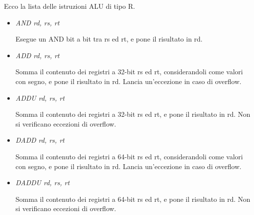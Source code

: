 \documentclass[letterpaper,10pt,english]{sphinxmanual}
\begin{document}
Ecco la lista delle istruzioni ALU di tipo R.
\begin{itemize}
\item {} 
\emph{AND rd, rs, rt}

Esegue un AND bit a bit tra rs ed rt, e pone il risultato in rd.

\item {} 
\emph{ADD rd, rs, rt}

Somma il contenuto dei registri a 32-bit rs ed rt, considerandoli come
valori con segno, e pone il risultato in rd.  Lancia un'eccezione in caso di
overflow.

\item {} 
\emph{ADDU rd, rs, rt}

Somma il contenuto dei registri a 32-bit rs ed rt, e pone il risultato in
rd. Non si verificano eccezioni di overflow.

\end{itemize}
\begin{itemize}
\item {} 
\emph{DADD rd, rs, rt}

Somma il contenuto dei registri a 64-bit rs ed rt, considerandoli come
valori con segno, e pone il risultato in rd.  Lancia un'eccezione in caso di
overflow.

\item {} 
\emph{DADDU rd, rs, rt}

Somma il contenuto dei registri a 64-bit rs ed rt, e pone il risultato in rd.
Non si verificano eccezioni di overflow.

\end{itemize}
\end{document}
